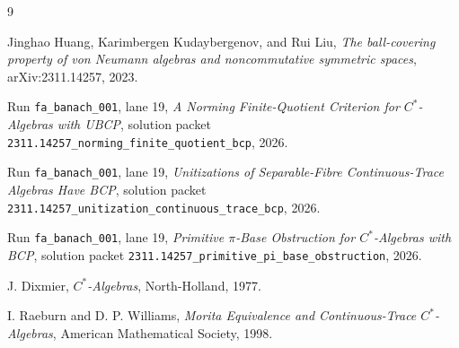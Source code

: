 \documentclass[11pt]{article}
\begin{document}
\begin{thebibliography}{9}

Jinghao Huang, Karimbergen Kudaybergenov, and Rui Liu,
\emph{The ball-covering property of von Neumann algebras and noncommutative
symmetric spaces},
arXiv:2311.14257, 2023.

Run \texttt{fa\_banach\_001}, lane 19,
\emph{A Norming Finite-Quotient Criterion for \(C^*\)-Algebras with UBCP},
solution packet
\texttt{2311.14257\_norming\_finite\_quotient\_bcp}, 2026.

Run \texttt{fa\_banach\_001}, lane 19,
\emph{Unitizations of Separable-Fibre Continuous-Trace Algebras Have BCP},
solution packet
\texttt{2311.14257\_unitization\_continuous\_trace\_bcp}, 2026.

Run \texttt{fa\_banach\_001}, lane 19,
\emph{Primitive \(\pi\)-Base Obstruction for \(C^*\)-Algebras with BCP},
solution packet
\texttt{2311.14257\_primitive\_pi\_base\_obstruction}, 2026.

J. Dixmier,
\emph{\(C^*\)-Algebras},
North-Holland, 1977.

I. Raeburn and D. P. Williams,
\emph{Morita Equivalence and Continuous-Trace \(C^*\)-Algebras},
American Mathematical Society, 1998.

\end{thebibliography}
\end{document}
